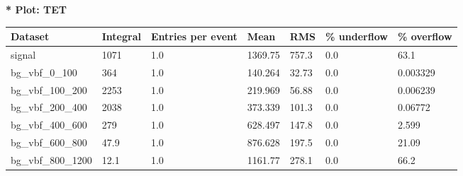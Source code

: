 \documentclass[a4paper, 10pt]{article}
\begin{document}
\textbf{* Plot: TET}\\
   \begin{table}[H]
  \begin{center}
    \begin{tabular}{|m{23.0mm}|m{23.0mm}|m{18.0mm}|m{19.0mm}|m{19.0mm}|m{19.0mm}|m{19.0mm}|}
      \hline
      {\cellcolor{yellow}         Dataset}& {\cellcolor{yellow}         Integral}& {\cellcolor{yellow}         Entries per event}& {\cellcolor{yellow}         Mean}& {\cellcolor{yellow}         RMS}& {\cellcolor{yellow}         \% underflow}& {\cellcolor{yellow}         \% overflow}\\
      \hline
      {\cellcolor{white}         signal}& {\cellcolor{white}         1071}& {\cellcolor{white}         1.0}& {\cellcolor{white}         1369.75}& {\cellcolor{white}         757.3}& {\cellcolor{red}         0.0}& {\cellcolor{red}         63.1}\\
      \hline
      {\cellcolor{white}         bg\_vbf\_0\_100}& {\cellcolor{white}         364}& {\cellcolor{white}         1.0}& {\cellcolor{white}         140.264}& {\cellcolor{white}         32.73}& {\cellcolor{green}         0.0}& {\cellcolor{green}         0.003329}\\
      \hline
      {\cellcolor{white}         bg\_vbf\_100\_200}& {\cellcolor{white}         2253}& {\cellcolor{white}         1.0}& {\cellcolor{white}         219.969}& {\cellcolor{white}         56.88}& {\cellcolor{green}         0.0}& {\cellcolor{green}         0.006239}\\
      \hline
      {\cellcolor{white}         bg\_vbf\_200\_400}& {\cellcolor{white}         2038}& {\cellcolor{white}         1.0}& {\cellcolor{white}         373.339}& {\cellcolor{white}         101.3}& {\cellcolor{green}         0.0}& {\cellcolor{green}         0.06772}\\
      \hline
      {\cellcolor{white}         bg\_vbf\_400\_600}& {\cellcolor{white}         279}& {\cellcolor{white}         1.0}& {\cellcolor{white}         628.497}& {\cellcolor{white}         147.8}& {\cellcolor{green}         0.0}& {\cellcolor{green}         2.599}\\
      \hline
      {\cellcolor{white}         bg\_vbf\_600\_800}& {\cellcolor{white}         47.9}& {\cellcolor{white}         1.0}& {\cellcolor{white}         876.628}& {\cellcolor{white}         197.5}& {\cellcolor{red}         0.0}& {\cellcolor{red}         21.09}\\
      \hline
      {\cellcolor{white}         bg\_vbf\_800\_1200}& {\cellcolor{white}         12.1}& {\cellcolor{white}         1.0}& {\cellcolor{white}         1161.77}& {\cellcolor{white}         278.1}& {\cellcolor{red}         0.0}& {\cellcolor{red}         66.2}\\

\end{tabular}
\end{center}
\end{table}
\end{document}
